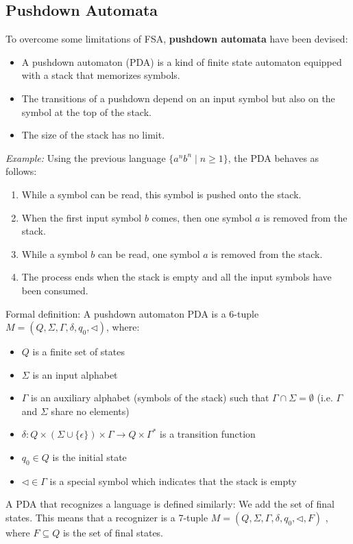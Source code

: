 \subsection{Pushdown Automata}
To overcome some limitations of FSA, \textbf{pushdown automata} have been devised:
\begin{itemize}
  \item A pushdown automaton (PDA) is a kind of finite state automaton equipped with a stack that memorizes symbols.
  \item The transitions of a pushdown depend on an input symbol but also on the symbol at the top of the stack.
  \item The size of the stack has no limit.
\end{itemize}
\textit{Example: } Using the previous language $\{a^n b^n \mid n \geq 1\}$, the PDA behaves as follows:
\begin{enumerate}
  \item While a symbol can be read, this symbol is pushed onto the stack.
  \item When the first input symbol $b$ comes, then one symbol $a$ is removed from the stack.
  \item While a symbol $b$ can be read, one symbol $a$ is removed from the stack.
  \item The process ends when the stack is empty and all the input symbols have been consumed.
\end{enumerate}
Formal definition: A pushdown automaton PDA is a 6-tuple $M = (Q,\Sigma,\Gamma,\delta,q_0,\triangleleft)$, where:
\begin{itemize}
  \item $Q$ is a finite set of states
  \item $\Sigma$ is an input alphabet
  \item $\Gamma$ is an auxiliary alphabet (symbols of the stack) such that $\Gamma \cap \Sigma = \emptyset$ (i.e. $\Gamma$ and $\Sigma$ share no elements)
  \item $\delta : Q \times (\Sigma \cup \{\epsilon\}) \times \Gamma \rightarrow Q \times \Gamma^{*}$ is a transition function
  \item $q_0 \in Q$ is the initial state
  \item $\triangleleft \in \Gamma$ is a special symbol which indicates that the stack is empty
\end{itemize}
A PDA that recognizes a language is defined similarly: We add the set of final states.
This means that a recognizer is a 7-tuple $M = (Q,\Sigma,\Gamma,\delta,q_0,\triangleleft,F)$ ,
where $F \subseteq Q$ is the set of final states.\\

